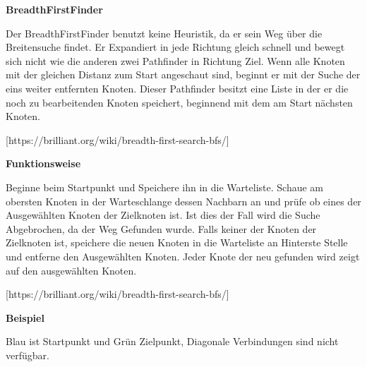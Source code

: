 \textbf{BreadthFirstFinder}

Der BreadthFirstFinder benutzt keine Heuristik, da er sein Weg über die
Breitensuche findet. Er Expandiert in jede Richtung gleich schnell und
bewegt sich nicht wie die anderen zwei Pathfinder in Richtung Ziel. Wenn
alle Knoten mit der gleichen Distanz zum Start angeschaut sind, beginnt
er mit der Suche der eins weiter entfernten Knoten. Dieser Pathfinder
besitzt eine Liste in der er die noch zu bearbeitenden Knoten speichert,
beginnend mit dem am Start nächsten Knoten.

{[}https://brilliant.org/wiki/breadth-first-search-bfs/{]}

\textbf{Funktionsweise}

Beginne beim Startpunkt und Speichere ihn in die Warteliste. Schaue am
obersten Knoten in der Warteschlange dessen Nachbarn an und prüfe ob
eines der Ausgewählten Knoten der Zielknoten ist. Ist dies der Fall wird
die Suche Abgebrochen, da der Weg Gefunden wurde. Falls keiner der
Knoten der Zielknoten ist, speichere die neuen Knoten in die Warteliste
an Hinterste Stelle und entferne den Ausgewählten Knoten. Jeder Knote
der neu gefunden wird zeigt auf den ausgewählten Knoten.

{[}https://brilliant.org/wiki/breadth-first-search-bfs/{]}

\textbf{Beispiel}

Blau ist Startpunkt und Grün Zielpunkt, Diagonale Verbindungen sind
nicht verfügbar.

